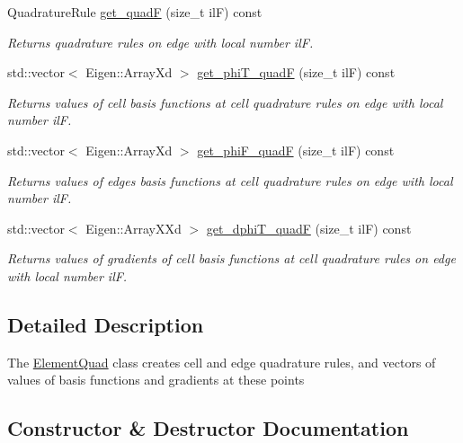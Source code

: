 \begin{DoxyCompactItemize}
Quadrature\+Rule \hyperlink{group__HybridCore_gaa90e88daa7803576aaeb9edc3574e935}{get\+\_\+quadF} (size\+\_\+t ilF) const
\begin{DoxyCompactList}\small\item\em Returns quadrature rules on edge with local number ilF. \end{DoxyCompactList}\item 
std\+::vector$<$ Eigen\+::\+Array\+Xd $>$ \hyperlink{group__HybridCore_ga89dc78ee0eea49e4a9725ed7df748ba9}{get\+\_\+phi\+T\+\_\+quadF} (size\+\_\+t ilF) const
\begin{DoxyCompactList}\small\item\em Returns values of cell basis functions at cell quadrature rules on edge with local number ilF. \end{DoxyCompactList}\item 
std\+::vector$<$ Eigen\+::\+Array\+Xd $>$ \hyperlink{group__HybridCore_ga2c8a70eb42762e460ad31e4d43afb0e8}{get\+\_\+phi\+F\+\_\+quadF} (size\+\_\+t ilF) const
\begin{DoxyCompactList}\small\item\em Returns values of edges basis functions at cell quadrature rules on edge with local number ilF. \end{DoxyCompactList}\item 
std\+::vector$<$ Eigen\+::\+Array\+X\+Xd $>$ \hyperlink{group__HybridCore_ga11e133360ae70b9aef714054b7de76a4}{get\+\_\+dphi\+T\+\_\+quadF} (size\+\_\+t ilF) const
\begin{DoxyCompactList}\small\item\em Returns values of gradients of cell basis functions at cell quadrature rules on edge with local number ilF. \end{DoxyCompactList}\end{DoxyCompactItemize}


\subsection{Detailed Description}
The \hyperlink{classHArDCore2D_1_1ElementQuad}{Element\+Quad} class creates cell and edge quadrature rules, and vectors of values of basis functions and gradients at these points 

\subsection{Constructor \& Destructor Documentation}
\mbox{\label{classHArDCore2D_1_1ElementQuad_a0d27ba99f9f3e6f2a3e5311e6be19eba}} 
